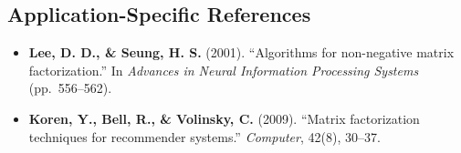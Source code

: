 \documentclass[11pt,oneside]{article}
\begin{document}
\subsection*{Application-Specific References}

\begin{itemize}
    \item \textbf{Lee, D. D., \& Seung, H. S.} (2001). ``Algorithms for non-negative matrix factorization.'' In \textit{Advances in Neural Information Processing Systems} (pp.\ 556--562).
    
    \item \textbf{Koren, Y., Bell, R., \& Volinsky, C.} (2009). ``Matrix factorization techniques for recommender systems.'' \textit{Computer}, 42(8), 30--37.
\end{itemize}
\end{document}

